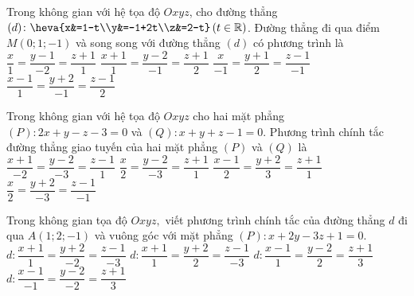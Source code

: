 \begin{ex}%
	Trong không gian với hệ tọa độ $Oxyz$, cho đường thẳng $(d)\colon \heva{x&=1-t\\y&=-1+2t\\z&=2-t}\,(t\in \mathbb{R})$. Đường thẳng đi qua điểm $M(0;1;-1)$ và song song với đường thẳng $(d)$ có phương trình là
	\choice
	{\True $\dfrac{x}{1}=\dfrac{y-1}{-2}=\dfrac{z+1}{1}$}
	{$\dfrac{x+1}{1}=\dfrac{y-2}{-1}=\dfrac{z+1}{2}$}
	{$\dfrac{x}{-1}=\dfrac{y+1}{2}=\dfrac{z-1}{-1}$}
	{$\dfrac{x-1}{1}=\dfrac{y+2}{-1}=\dfrac{z-1}{2}$}
\end{ex}
\begin{ex}%
	Trong không gian với hệ tọa độ $Oxyz$ cho hai mặt phẳng $(P): 2x + y - z - 3 = 0$ và $(Q): x + y + z - 1 = 0$. Phương trình chính tắc đường thẳng giao tuyến của hai mặt phẳng $(P)$ và $(Q)$ là 
	\choice
	{$\dfrac{x+1}{-2} = \dfrac{y - 2}{-3} = \dfrac{z - 1}{1}$}
	{\True $\dfrac{x}{2} = \dfrac{y - 2}{-3} = \dfrac{z + 1}{1}$}
	{$\dfrac{x - 1}{2} = \dfrac{y + 2}{3} = \dfrac{z + 1}{1}$}
	{$\dfrac{x}{2} = \dfrac{y + 2}{-3} = \dfrac{z - 1}{-1}$}
\end{ex}
\begin{ex}%
	Trong không gian tọa độ $Oxyz,$ viết phương trình chính tắc của đường thẳng $d$ đi qua $A(1; 2; -1)$ và vuông góc với mặt phẳng $(P)\colon x+2y-3z+1=0.$
	\choice
	{$d\colon \dfrac{x+1}{1}=\dfrac{y+2}{-2}=\dfrac{z-1}{-3}$}
	{$d\colon \dfrac{x+1}{1}=\dfrac{y+2}{2}=\dfrac{z-1}{-3}$}
	{$d\colon \dfrac{x-1}{1}=\dfrac{y-2}{2}=\dfrac{z+1}{3}$}
	{\True $d\colon \dfrac{x-1}{-1}=\dfrac{y-2}{-2}=\dfrac{z+1}{3}$}
\end{ex}
